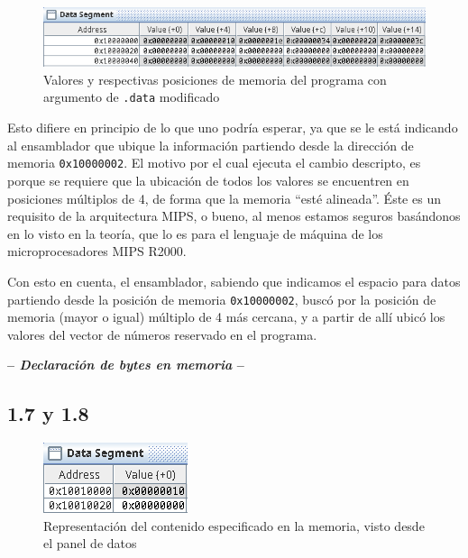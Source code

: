 \documentclass[a4paper]{report}
\begin{document}
\begin{figure}[h]
    \centering
    \captionsetup{justification = centering}
    \includegraphics[width=.8\linewidth]{img/c1-6}
    \caption{Valores y respectivas posiciones de memoria del programa con argumento de \texttt{.data} modificado}
    \label{fig:not-multiple}
\end{figure}

Esto difiere en principio de lo que uno podría esperar, ya que se le está indicando al ensamblador que ubique la información partiendo desde la dirección de memoria \texttt{0x10000002}. El motivo por el cual ejecuta el cambio descripto, es porque se requiere que la ubicación de todos los valores se encuentren en posiciones múltiplos de 4, de forma que la memoria ``esté alineada''. Éste es un requisito de la arquitectura MIPS, o bueno, al menos estamos seguros basándonos en lo visto en la teoría, que lo es para el lenguaje de máquina de los microprocesadores MIPS R2000.

Con esto en cuenta, el ensamblador, sabiendo que indicamos el espacio para datos partiendo desde la posición de memoria \texttt{0x10000002}, buscó por la posición de memoria (mayor o igual) múltiplo de 4 más cercana, y a partir de allí ubicó los valores del vector de números reservado en el programa.

\begin{center}
\large\textbf{-- \textsl{Declaración de bytes en memoria} --}
\label{sec:decl-byte-mem}
\end{center}

\subsection*{1.7 y 1.8}

\begin{figure}
    \centering
    \captionsetup{justification = centering}
    \includegraphics[width=\linewidth]{img/c1-7}
    \caption{Representación del contenido especificado en la memoria, visto desde el panel de datos}
    \label{fig:c1-7}
\end{figure}
\end{document}
